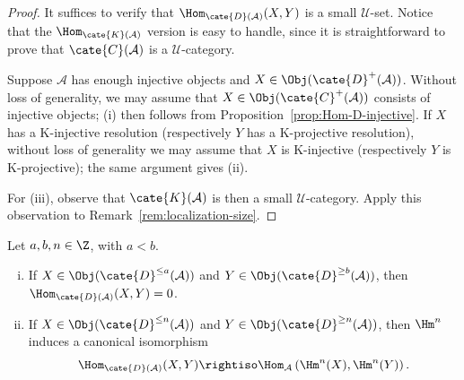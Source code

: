 \begin{proof}
	It suffices to verify that $\Hom_{\cate{D}(\mathcal{A})}(X,Y)$ is a small
	$\mathcal{U}$-set. Notice that the $\Hom_{\cate{K}(\mathcal{A})}$ version
	is easy to handle, since it is straightforward to prove that
	$\cate{C}(\mathcal{A})$ is a $\mathcal{U}$-category.

	Suppose $\mathcal{A}$ has enough injective objects and
	$X \in \Obj(\cate{D}^+(\mathcal{A}))$. Without loss of generality, we
	may assume that $X \in \Obj(\cate{C}^+(\mathcal{A}))$ consists of
	injective objects; (i) then follows from
	Proposition~\ref{prop:Hom-D-injective}. If $X$ has a K-injective resolution
	(respectively $Y$ has a K-projective resolution), without loss of
	generality we may assume that $X$ is K-injective (respectively $Y$ is
	K-projective); the same argument gives (ii).

	For (iii), observe that $\cate{K}(\mathcal{A})$ is then a small
	$\mathcal{U}$-category. Apply this observation to
	Remark~\ref{rem:localization-size}.
\end{proof}


\begin{proposition}[Orthogonality]\label{prop:derived-cat-orthogonality}
	Let $a,b,n\in\Z$, with $a<b$.
	\begin{enumerate}[(i)]
		\item If $X \in \Obj(\cate{D}^{\leq a}(\mathcal{A}))$ and
		$Y \in \Obj(\cate{D}^{\geq b}(\mathcal{A}))$, then
		$\Hom_{\cate{D}(\mathcal{A})}(X,Y)=0$.
		\item If $X \in \Obj(\cate{D}^{\leq n}(\mathcal{A}))$ and
		$Y \in \Obj(\cate{D}^{\geq n}(\mathcal{A}))$, then $\Hm^n$
		induces a canonical isomorphism
		\[ \Hom_{\cate{D}(\mathcal{A})}(X, Y) \rightiso \Hom_{\mathcal{A}}\left( \Hm^n(X), \Hm^n(Y) \right). \]
	\end{enumerate}
\end{proposition}

